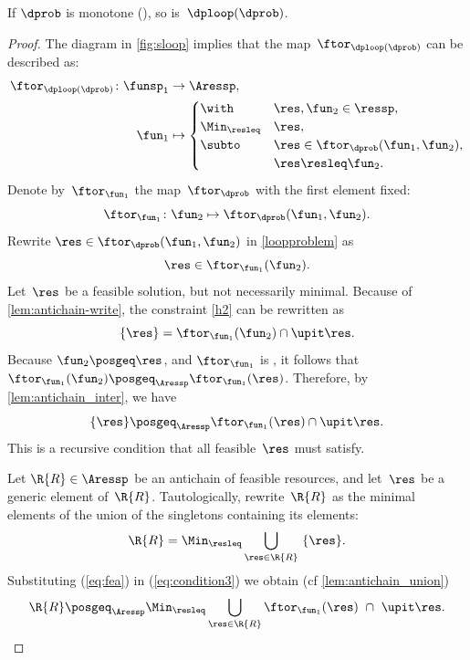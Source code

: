 \begin{proposition}
\label{pro:loop-continuous}If $\dprob$ is monotone (),
so is~$\dploop(\dprob)$.
\end{proposition}
\begin{proof}
The diagram in \cref{fig:sloop} implies that the map~$\ftor_{\dploop(\dprob)}$
can be described as:
\begin{align}
\ftor_{\dploop(\dprob)}\colon\funsp_{1} & \rightarrow\Aressp,\label{eq:loopproblem}\\
\fun_{1} & \mapsto\begin{cases}
\with & \res,\fun_{2}\in\ressp,\\
\Min_{\resleq} & \res,\\
\subto & \res\in\ftor_{\dprob}(\fun_{1},\fun_{2}),\\
 & \res\resleq\fun_{2}.
\end{cases}
\end{align}
Denote by~$\ftor_{\fun_{1}}$ the map~$\ftor_{\dprob}$ with the
first element fixed:
\[
\ftor_{\fun_{1}}\colon\fun_{2}\mapsto\ftor_{\dprob}(\fun_{1},\fun_{2}).
\]
Rewrite $\res\in\ftor_{\dprob}(\fun_{1},\fun_{2})$ in \eqref{loopproblem}
as
\begin{equation}
\res\in\ftor_{\fun_{1}}(\fun_{2}).\label{eq:h2}
\end{equation}
Let~$\res$ be a feasible solution, but not necessarily minimal.
Because of \cref{lem:antichain-write}, the constraint \eqref{h2} can
be rewritten as
\begin{equation}
\{\res\}=\ftor_{\fun_{1}}(\fun_{2})\cap\upit\res.\label{eq:h3}
\end{equation}
Because $\fun_{2}\posgeq\res$, and $\ftor_{\fun_{1}}$ is \scottcontinuous,
it follows that~$\ftor_{\fun_{1}}(\fun_{2})\posgeq_{\Aressp}\ftor_{\fun_{1}}(\res)$.
Therefore, by \cref{lem:antichain_inter}, we have
\begin{equation}
\{\res\}\posgeq_{\Aressp}\ftor_{\fun_{1}}(\res)\cap\upit\res.\label{eq:fea}
\end{equation}
This is a recursive condition that all feasible~$\res$ must satisfy.

Let $\R{R}\in\Aressp$ be an antichain of feasible resources, and
let~$\res$ be a generic element of~$\R{R}$. Tautologically, rewrite~$\R{R}$
as the minimal elements of the union of the singletons containing
its elements:
\begin{equation}
\R{R}=\Min_{\resleq}\bigcup_{\res\in\R{R}}\ \{\res\}.\label{eq:condition3}
\end{equation}
Substituting (\ref{eq:fea}) in (\ref{eq:condition3}) we obtain (cf
\cref{lem:antichain_union})
\begin{equation}
\R{R}\posgeq_{\Aressp}\Min_{\resleq}\bigcup_{\res\in\R{R}}\ftor_{\fun_{1}}(\res)\ \cap\ \upit\res.\label{eq:recursive}
\end{equation}


\end{proof}
